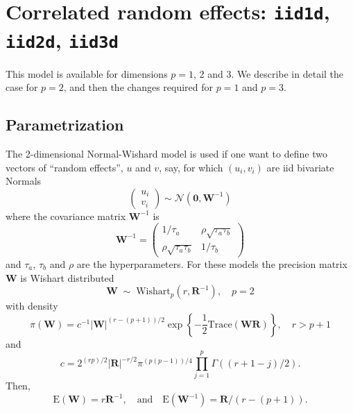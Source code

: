 \documentclass[a4paper,11pt]{article}
\begin{document}
\section*{Correlated random effects: \texttt{iid1d}, \texttt{iid2d},
    \texttt{iid3d}}

This model is available for dimensions $p=1$, $2$ and $3$. We describe
in detail the case for $p=2$, and then the changes required for $p=1$
and $p=3$.

\subsection*{Parametrization}

The 2-dimensional Normal-Wishard model is used if one want to define
two vectors of ``random effects'', $u$ and $v$, say, for which
$(u_{i}, v_{i})$ are iid bivariate Normals
\begin{displaymath}
    \left(
      \begin{array}{c}
          u_{i}\\
          v_{i}
      \end{array}\right)
    \sim \mathcal{N}\left(\mathbf{0}, \mathbf{W}^{-1}\right)
\end{displaymath}
where the  covariance matrix $\mathbf{W}^{-1}$ is
\begin{equation}
    \label{precision}
    \mathbf{W}^{-1} = \left(\begin{array}{cc}
          1/\tau_a & \rho \sqrt{\tau_a\tau_b}\\
          \rho\sqrt{\tau_a\tau_b}&  1/\tau_b
      \end{array}\right)
\end{equation}
and $\tau_{a}$, $\tau_{b}$ and $\rho$ are the hyperparameters. For
these models the precision matrix $\mathbf{W}$ is Wishart distributed
\begin{displaymath}
    \mathbf{W}
    \;\sim\;\text{Wishart}_{p}(r, \mathbf{R}^{-1}), \quad p=2
\end{displaymath}
with density
\begin{displaymath}
    \pi(\mathbf{W}) = c^{-1} |\mathbf{W}|^{(r-(p+1))/2} \exp\left\{
      -\frac{1}{2}\text{Trace}(\mathbf{W}\mathbf{R})\right\}, \quad r > p+1
\end{displaymath}
and
\begin{displaymath}
    c = 2^{(rp)/2} |\mathbf{R}|^{-r/2} \pi^{(p(p-1))/4}\prod_{j=1}^{p}
    \Gamma((r+1-j)/2).
\end{displaymath}
Then,
\begin{displaymath}
    \text{E}(\mathbf{W}) = r\mathbf{R}^{-1}, \quad\text{and}\quad
    \text{E}(\mathbf{W}^{-1}) = \mathbf{R}/(r-(p+1)).
\end{displaymath}
\end{document}
